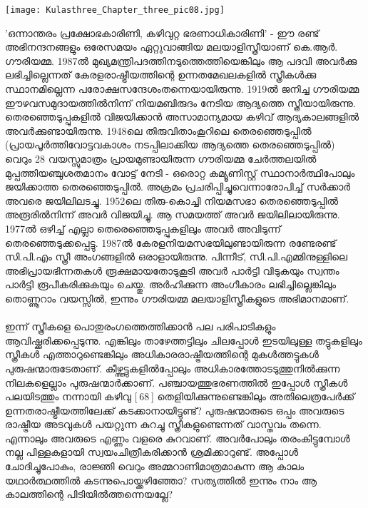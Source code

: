 \label{ch3box4} %
\begin{tcolorbox}[%
 breakable, %
  arc=0mm, 
  left=1pt, right = 1pt, 
  boxrule=0mm,
  colback = {blue!10}, %
] 
\begin{center}
\texttt{[image: Kulasthree\_Chapter\_three\_pic08.jpg]}
\end{center}
'ഒന്നാന്തരം പ്രക്ഷോഭകാരിണി, കഴിവുറ്റ ഭരണാധികാരിണി' - ഈ രണ്ട് അഭിനന്ദനങ്ങളും ഒരേസമയം ഏറ്റുവാങ്ങിയ മലയാളിസ്ത്രീയാണ് കെ.ആർ. ഗൗരിയമ്മ. 1987ൽ മുഖ്യമന്ത്രിപദത്തിനടുത്തെത്തിയെങ്കിലും ആ പദവി അവർക്കു ലഭിച്ചില്ലെന്നത് കേരളരാഷ്ട്രീയത്തിന്റെ ഉന്നതമേഖലകളിൽ സ്ത്രീകൾക്കു സ്ഥാനമില്ലെന്ന പരോക്ഷസന്ദേശംതന്നെയായിരുന്നു. 1919ൽ ജനിച്ച ഗൗരിയമ്മ ഈഴവസമുദായത്തിൽനിന്ന് നിയമബിരുദം നേടിയ ആദ്യത്തെ സ്ത്രീയായിരുന്നു. തെരഞ്ഞെടുപ്പുകളിൽ വിജയിക്കാൻ അസാമാന്യമായ കഴിവ് ആദ്യകാലങ്ങളിൽ അവർക്കുണ്ടായിരുന്നു. 1948ലെ തിരുവിതാംകൂറിലെ തെരഞ്ഞെടുപ്പിൽ (പ്രായപൂർത്തിവോട്ടവകാശം നടപ്പിലാക്കിയ ആദ്യത്തെ തെരഞ്ഞെടുപ്പിൽ) വെറും 28 വയസ്സുമാത്രം പ്രായമുണ്ടായിരുന്ന ഗൗരിയമ്മ ചേർത്തലയിൽ മുപ്പത്തിയഞ്ചുശതമാനം വോട്ട് നേടി - ഒരൊറ്റ കമ്യൂണിസ്റ്റ് സ്ഥാനാർത്ഥിപോലും ജയിക്കാത്ത തെരഞ്ഞെടുപ്പിൽ. അക്രമം പ്രചരിപ്പിച്ചുവെന്നാരോപിച്ച് സർക്കാർ അവരെ ജയിലിലടച്ചു. 1952ലെ തിരു-കൊച്ചി നിയമസഭാ തെരഞ്ഞെടുപ്പിൽ അരൂരിൽനിന്ന് അവർ വിജയിച്ചു. ആ സമയത്ത് അവർ ജയിലിലായിരുന്നു. 1977ൽ ഒഴിച്ച് എല്ലാ തെരെഞ്ഞെടുപ്പുകളിലും അവർ അവിടുന്ന് തെരഞ്ഞെടുക്കപ്പെട്ടു. 1987ൽ കേരളനിയമസഭയിലുണ്ടായിരുന്ന രണ്ടേരണ്ട് സി.പി.എം സ്ത്രീ അംഗങ്ങളിൽ ഒരാളായിരുന്നു. പിന്നീട്, സി.പി.എമ്മിനുള്ളിലെ അഭിപ്രായഭിന്നതകൾ രൂക്ഷമായതോടുകൂടി അവർ പാർട്ടി വിടുകയും സ്വന്തം പാർട്ടി രൂപീകരിക്കുകയും ചെയ്തു. അർഹിക്കുന്ന അംഗീകാരം ലഭിച്ചില്ലെങ്കിലും തൊണ്ണൂറാം വയസ്സിൽ, ഇന്നും ഗൗരിയമ്മ മലയാളിസ്ത്രീകളുടെ അഭിമാനമാണ്.

\end{tcolorbox}

\paragraph{}ഇന്ന് സ്ത്രീകളെ പൊതുരംഗത്തെത്തിക്കാൻ പല പരിപാടികളും ആവിഷ്ക്കരിക്കപ്പെടുന്നു. എങ്കിലും താഴേത്തട്ടിലും ചിലപ്പോൾ ഇടയിലുള്ള തട്ടുകളിലും സ്ത്രീകൾ എത്താറുണ്ടെങ്കിലും അധികാരരാഷ്ട്രീയത്തിന്റെ മുകൾത്തട്ടുകൾ പുരുഷന്മാരുടേതാണ്. കീഴ്ത്തട്ടുകളിൽപ്പോലും അധികാരത്തോടടുത്തുനിൽക്കുന്ന നിലകളെല്ലാം പുരുഷന്മാർക്കാണ്. പഞ്ചായത്തുഭരണത്തിൽ ഇപ്പോൾ സ്ത്രീകൾ പലയിടത്തും നന്നായി കഴിവു [ 68 ] തെളിയിക്കുന്നുണ്ടെങ്കിലും അതിലെത്രപേർക്ക് ഉന്നതരാഷ്ട്രീയത്തിലേക്ക് കടക്കാനായിട്ടുണ്ട്? പുരുഷന്മാരുടെ ഒപ്പം അവരുടെ രാഷ്ട്രീയ അടവുകൾ പയറ്റുന്ന കുറച്ചു സ്ത്രീകളുണ്ടെന്നത് വാസ്തവം തന്നെ. എന്നാലും അവരുടെ എണ്ണം വളരെ കുറവാണ്. അവർപോലും തരംകിട്ടുമ്പോൾ നല്ല പിള്ളകളായി സ്വയംചിത്രീകരിക്കാൻ ശ്രമിക്കാറുണ്ട്. അപ്പോൾ ചോദിച്ചുപോകും, രാജ്ഞി വെറും അമ്മറാണിമാത്രമാകുന്ന ആ കാലം യഥാർത്ഥത്തിൽ കടന്നുപൊയ്ക്കഴിഞ്ഞോ? സത്യത്തിൽ ഇന്നും നാം ആ കാലത്തിന്റെ പിടിയിൽത്തന്നെയല്ലേ?

